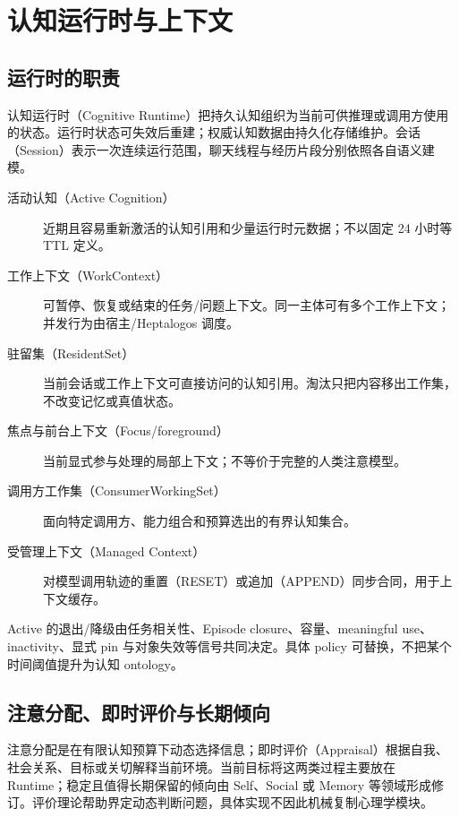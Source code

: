 \chapter{认知运行时与上下文}

\section{运行时的职责}

认知运行时（Cognitive Runtime）把持久认知组织为当前可供推理或调用方使用的状态。运行时状态可失效后重建；权威认知数据由持久化存储维护。会话（Session）表示一次连续运行范围，聊天线程与经历片段分别依照各自语义建模。\cite{nous-research-package}

\begin{description}
\item[活动认知（Active Cognition）] 近期且容易重新激活的认知引用和少量运行时元数据；不以固定 24 小时等 TTL 定义。
\item[工作上下文（WorkContext）] 可暂停、恢复或结束的任务/问题上下文。同一主体可有多个工作上下文；并发行为由宿主/Heptalogos 调度。
\item[驻留集（ResidentSet）] 当前会话或工作上下文可直接访问的认知引用。淘汰只把内容移出工作集，不改变记忆或真值状态。
\item[焦点与前台上下文（Focus/foreground）] 当前显式参与处理的局部上下文；不等价于完整的人类注意模型。
\item[调用方工作集（ConsumerWorkingSet）] 面向特定调用方、能力组合和预算选出的有界认知集合。
\item[受管理上下文（Managed Context）] 对模型调用轨迹的重置（RESET）或追加（APPEND）同步合同，用于上下文缓存。
\end{description}

Active 的退出/降级由任务相关性、Episode closure、容量、meaningful use、inactivity、显式 pin 与对象失效等信号共同决定。具体 policy 可替换，不把某个时间阈值提升为认知 ontology。

\section{注意分配、即时评价与长期倾向}

注意分配是在有限认知预算下动态选择信息；即时评价（Appraisal）根据自我、社会关系、目标或关切解释当前环境。当前目标将这两类过程主要放在 Runtime；稳定且值得长期保留的倾向由 Self、Social 或 Memory 等领域形成修订。评价理论帮助界定动态判断问题，具体实现不因此机械复制心理学模块。\cite{marsella-gratch2009,nous-research-package}


